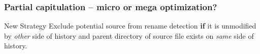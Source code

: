 \documentclass[compress,t]{beamer}
\begin{document}
\begin{frame}[fragile]

\end{frame}


\begin{frame}[fragile]
  \frametitle{Partial capitulation -- micro or mega optimization?}

  \vspace*{-1.5\baselineskip}
  \begin{center}
  \begin{minipage}{0.8\textwidth}
  \begin{block}{New Strategy}
    Exclude potential source from rename detection \textbf{if} it is
    unmodified by \textit{other} side of history and parent directory
    of source file exists on \textit{same} side of history.
  \end{block}
  \end{minipage}
  \end{center}


\end{frame}

\end{document}
